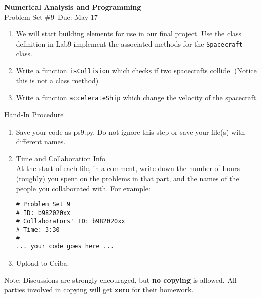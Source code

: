 \documentclass[12pt]{article}
\begin{document}
\begin{center}
\Large
\textbf{Numerical Analysis and Programming}\\
\large
Problem Set \#9\
Due: May 17
\end{center}

\begin{enumerate}

\item We will start building elements for use in our final project. 
 Use the class definition in Lab9 implement the associated methods for the {\tt Spacecraft} class.
\item Write a function {\tt isCollision} which checks if two spacecrafts collide. (Notice this is not a class method)
\item Write a function {\tt accelerateShip} which change the velocity of the spacecraft. 
\end{enumerate}
Hand-In Procedure  
\begin{enumerate}
\item Save your code as  ps9.py.
 Do not ignore this step or save your file(s) with different names. 
\item Time and Collaboration Info \\
At the start of each file, in a comment, write down the number of hours (roughly) you spent on 
the problems in that part, and the names of the people you collaborated with. For example:
\begin{verbatim}
# Problem Set 9
# ID: b982020xx
# Collaborators' ID: b982020xx
# Time: 3:30
# 
... your code goes here ...
\end{verbatim}
\item Upload to Ceiba.
\end{enumerate}
Note: Discussions are strongly encouraged, but \textbf{no copying} is allowed. All parties involved in copying will get \textbf{zero} for their homework. 
\end{document}
